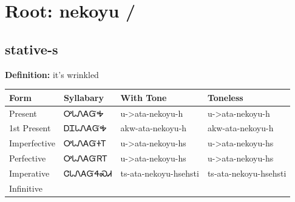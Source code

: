 \documentclass{article}%
\begin{document}
%
\normalsize%
\section*{Root: nekoyu / }%
\subsection*{stative-s}%
\textbf{Definition: }%
it’s wrinkled%
\\[0.5em]%
\begin{tabular}{|l|l|l|l|}%
\hline%
\textbf{Form}&\textbf{Syllabary}&\textbf{With Tone}&\textbf{Toneless}\\%
\hline%
Present&ᎤᏓᏁᎪᏳᎭ&u{-}>ata{-}nekoyu{-}h&u{-}>ata{-}nekoyu{-}h\\%
1st Present&ᎠᏆᏓᏁᎪᏳᎭ&akw{-}ata{-}nekoyu{-}h&akw{-}ata{-}nekoyu{-}h\\%
Imperfective&ᎤᏓᏁᎪᏳᏐᎢ&u{-}>ata{-}nekoyu{-}hs&u{-}>ata{-}nekoyu{-}hs\\%
Perfective&ᎤᏓᏁᎪᏳᏒᎢ&u{-}>ata{-}nekoyu{-}hs&u{-}>ata{-}nekoyu{-}hs\\%
Imperative&ᏣᏓᏁᎪᏳᏎᏍᏗ&ts{-}ata{-}nekoyu{-}hsehsti&ts{-}ata{-}nekoyu{-}hsehsti\\%
Infinitive&&&\\%
\hline%
\end{tabular}%
\\[1em]%
\end{document}
